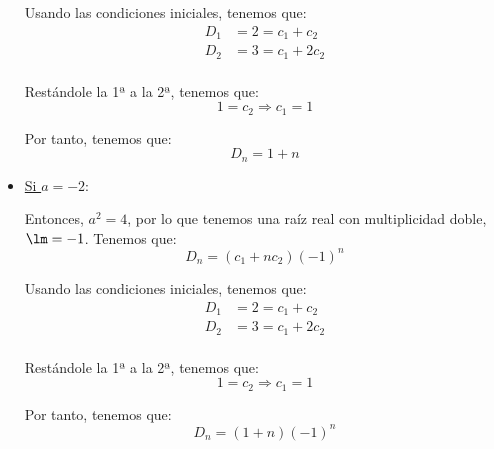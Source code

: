 \begin{ejercicio}
\begin{itemize}
        Usando las condiciones iniciales, tenemos que:
        \begin{align*}
            D_1 &= 2 = c_1+c_2\\
            D_2 &= 3 = c_1+2c_2\\
        \end{align*}

        Restándole la 1ª a la 2ª, tenemos que:
        \begin{equation*}
            1 = c_2 \Longrightarrow c_1=1
        \end{equation*}

        Por tanto, tenemos que:
        \begin{equation*}
            D_n = 1+n
        \end{equation*}

        \item \ul{Si $a=-2$}:

        Entonces, $a^2=4$, por lo que tenemos una raíz real con multiplicidad doble, $\lm = -1$.
        Tenemos que:
        \begin{equation*}
            D_n = (c_1+nc_2)(-1)^n
        \end{equation*}

        Usando las condiciones iniciales, tenemos que:
        \begin{align*}
            D_1 &= 2 = c_1+c_2\\
            D_2 &= 3 = c_1+2c_2\\
        \end{align*}

        Restándole la 1ª a la 2ª, tenemos que:
        \begin{equation*}
            1 = c_2 \Longrightarrow c_1=1
        \end{equation*}

        Por tanto, tenemos que:
        \begin{equation*}
            D_n = (1+n)(-1)^n
        \end{equation*}

    \end{itemize}
\end{ejercicio}

